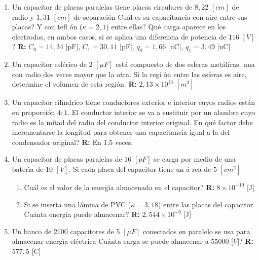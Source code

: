 \documentclass{article}
\begin{document}
\begin{enumerate}
\item Un capacitor de placas paralelas tiene placas circulares de $8,22$ $%
[cm]$ de radio y $1,31$ $[cm]$ de separaci\'{o}n \textquestiondown Cu\'{a}l
es su capacitancia con aire entre sus placas? \textquestiondown Y con tefl%
\'{o}n ($\kappa =2,1$) entre ellas? \textquestiondown Qu\'{e} carga aparece
en los electrodos, en ambos casos, si se aplica una diferencia de potencia
de $116$ $[V]$? \textbf{R:} $C_{0}=14,34$ [pF], $C_{1}=30,11$ [pF], $%
q_{0}=1,66$ [nC], $q_{1}=3,49$ [nC]

\item Un capacitor esf\'{e}rico de $2$ $[\mu F]$ est\'{a} compuesto de dos
esferas met\'{a}licas, una con radio dos veces mayor que la otra. Si la regi%
\'{o}n entre las esferas es aire, determine el volumen de esta regi\'{o}n. 
\textbf{R:} $2,13\times 10^{13}$ $[m^{3}]$

\item Un capacitor cil\'{\i}ndrico tiene conductores exterior e interior
cuyos radios est\'{a}n en proporci\'{o}n $4:1$. El conductor interior se va
a sustituir por un alambre cuyo radio es la mitad del radio del conductor
interior original. \textquestiondown En qu\'{e} factor debe incrementarse la
longitud para obtener una capacitancia igual a la del condensador original? 
\textbf{R: }En 1,5 veces.

\item Un capacitor de placas paralelas de $16$ $[pF]$ se carga por medio de
una bater\'{\i}a de $10$ $[V]$. Si cada placa del capacitor tiene un \'{a}%
rea de $5$ $[cm^{2}]$

\begin{enumerate}
\item \textquestiondown Cu\'{a}l es el valor de la energ\'{\i}a almacenada
en el capacitor? \textbf{R: }$8\times 10^{-10}$ [J]

\item Si se inserta una l\'{a}mina de PVC ($\kappa =3,18$) entre las placas
del capacitor \textquestiondown Cu\'{a}nta energ\'{\i}a puede almacenar? 
\textbf{R: }$2,544\times 10^{-9}$ [J]
\end{enumerate}

\item Un banco de 2100 capacitores de 5 $[\mu F]$ conectados en paralelo se
usa para almacenar energ\'{\i}a el\'{e}ctrica \textquestiondown Cu\'{a}nta
carga se puede almacenar a $55000$ [$V]$? \textbf{R: }$577,5$ [C]


\end{enumerate}
\end{document}
